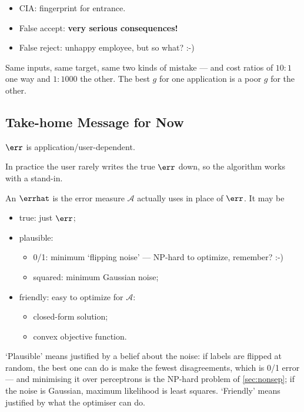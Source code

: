 \begin{itemize}
    \item CIA: fingerprint for entrance.
    \item False accept: \textbf{very serious consequences!}
    \item False reject: unhappy employee, but so what? :-)
\end{itemize}

Same inputs, same target, same two kinds of mistake --- and cost ratios of
\(10 : 1\) one way and \(1 : 1000\) the other. The best \(g\) for one
application is a poor \(g\) for the other.

\subsection{Take-home Message for Now}

\begin{moral}
    \(\err\) is application/user-dependent.
\end{moral}

In practice the user rarely writes the true \(\err\) down, so the algorithm
works with a stand-in.

\begin{definition}\label{def:errhat}
    An  \(\errhat\) is the error measure
    \(\mathcal{A}\) actually uses in place of \(\err\). It may be
    \begin{itemize}
        \item true: just \(\err\);
        \item plausible:
        \begin{itemize}
            \item 0/1: minimum `flipping noise' --- NP-hard to optimize,
                remember? :-)
            \item squared: minimum Gaussian noise;
        \end{itemize}
        \item friendly: easy to optimize for \(\mathcal{A}\):
        \begin{itemize}
            \item closed-form solution;
            \item convex objective function.
        \end{itemize}
    \end{itemize}
\end{definition}

`Plausible' means justified by a belief about the noise: if labels are flipped
at random, the best one can do is make the fewest disagreements, which is 0/1
error --- and minimising it over perceptrons is the NP-hard problem of
\autoref{sec:nonsep}; if the noise is Gaussian, maximum likelihood is least
squares. `Friendly' means justified by what the optimiser can do.

